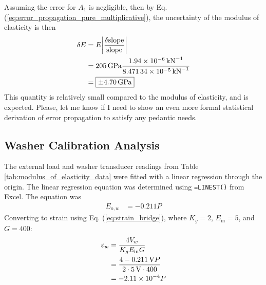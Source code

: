 Assuming the error for $A_1$ is negligible, then by Eq. (\ref{eq:error_propagation_pure_multiplicative}), the uncertainty of the modulus of elasticity is then
\begin{align*}
    \delta E &= E \bigg|\frac{\delta \text{slope}}{\text{slope}}\bigg|\\
    &= \qty{205}{\giga\pascal} \frac{\qty{1.94E-06}{\per\kilo\newton}}{\qty{8.47134E-05}{\per\kilo\newton}} \\
    &= \boxed{\pm \qty{4.70}{\giga\pascal}}
\end{align*}
This quantity is relatively small compared to the modulus of elasticity, and is expected. Please, let me know if I need to show an even more formal statistical derivation of error propagation to satisfy any pedantic needs.

\subsection{Washer Calibration Analysis}
The external load and washer transducer readings from Table \ref{tab:modulus_of_elasticity_data} were fitted with a linear regression through the origin. The linear regression equation was determined using \texttt{=LINEST()} from Excel. The equation was 
\begin{align*}
    E_{o, w} &= -0.211 P 
\end{align*}
Converting to strain using Eq. (\ref{eq:strain_bridge}), where $K_g = 2$, $E_{\text{in}} = 5$, and $G = 400$:
\begin{align*}
    \varepsilon_w &= \frac{4 V_{w}}{K_g E_{\text{in}} G} \\
    &= \frac{4 \qty{-0.211}{V}P}{2 \cdot \qty{5}{V} \cdot 400} \\
    &= \qty{-2.11E-04}{} P
\end{align*}


